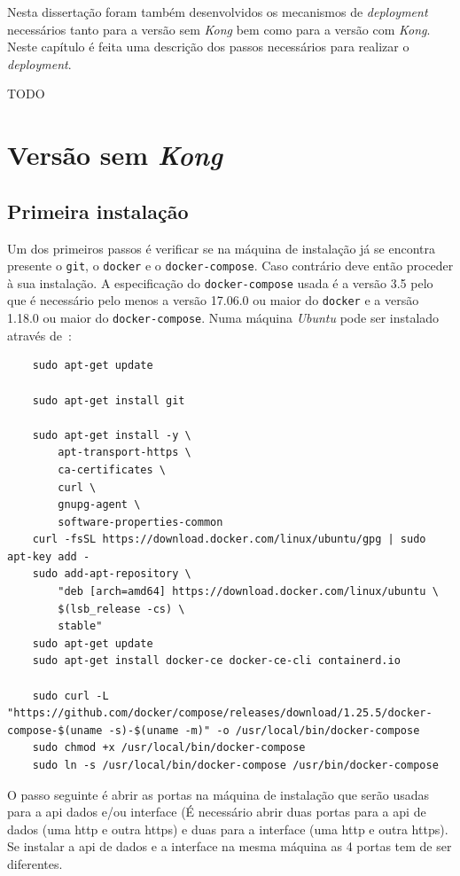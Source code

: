 Nesta dissertação foram também desenvolvidos os mecanismos de \textit{deployment} necessários tanto para a versão sem \textit{Kong} bem como para a versão com \textit{Kong}. Neste capítulo é feita uma descrição dos passos necessários para realizar o \textit{deployment}.

TODO

\section{Versão sem \textit{Kong}}

\subsection{Primeira instalação}\label{sec:inst-prim}

Um dos primeiros passos é verificar se na máquina de instalação já se encontra presente o \texttt{git}, o \texttt{docker} e o \texttt{docker-compose}. Caso contrário deve então proceder à sua instalação. A especificação do \texttt{docker-compose} usada é a versão 3.5 pelo que é necessário pelo menos a versão 17.06.0 ou maior do \texttt{docker} e a versão 1.18.0 ou maior do \texttt{docker-compose}. Numa máquina \textit{Ubuntu} pode ser instalado através de~\cite{installDocker,installDC}:
\begin{verbatim}
    sudo apt-get update

    sudo apt-get install git

    sudo apt-get install -y \
        apt-transport-https \
        ca-certificates \
        curl \
        gnupg-agent \
        software-properties-common
    curl -fsSL https://download.docker.com/linux/ubuntu/gpg | sudo apt-key add -
    sudo add-apt-repository \
        "deb [arch=amd64] https://download.docker.com/linux/ubuntu \
        $(lsb_release -cs) \
        stable"
    sudo apt-get update
    sudo apt-get install docker-ce docker-ce-cli containerd.io

    sudo curl -L "https://github.com/docker/compose/releases/download/1.25.5/docker-compose-$(uname -s)-$(uname -m)" -o /usr/local/bin/docker-compose
    sudo chmod +x /usr/local/bin/docker-compose
    sudo ln -s /usr/local/bin/docker-compose /usr/bin/docker-compose
\end{verbatim}

O passo seguinte é abrir as portas na máquina de instalação que serão usadas para a \acrshort{api} dados e/ou interface (É necessário abrir duas portas para a \acrshort{api} de dados (uma {http} e outra \acrshort{https}) e duas para a interface (uma \acrshort{http} e outra \acrshort{https}). Se instalar a \acrshort{api} de dados e a interface na mesma máquina as 4 portas tem de ser diferentes.

